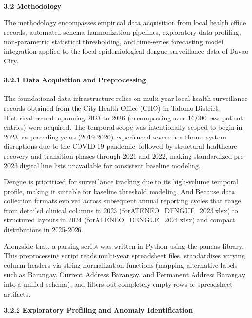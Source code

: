 \documentclass[
]{article}
\begin{document}
\textbf{3.2 Methodology}

The methodology encompasses empirical data acquisition from local health
office records, automated schema harmonization pipelines, exploratory
data profiling, non-parametric statistical thresholding, and time-series
forecasting model integration applied to the local epidemiological
dengue surveillance data of Davao City.

\paragraph{\texorpdfstring{\textbf{3.2.1 Data Acquisition and
Preprocessing}
}{3.2.1 Data Acquisition and Preprocessing }}\label{data-acquisition-and-preprocessing}

The foundational data infrastructure relies on multi-year local health
surveillance records obtained from the City Health Office (CHO) in
Talomo District. Historical records spanning 2023 to 2026 (encompassing
over 16,000 raw patient entries) were acquired. The temporal scope was
intentionally scoped to begin in 2023, as preceding years (2019-2020)
experienced severe healthcare system disruptions due to the COVID-19
pandemic, followed by structural healthcare recovery and transition
phases through 2021 and 2022, making standardized pre-2023 digital line
lists unavailable for consistent baseline modeling.

Dengue is prioritized for surveillance tracking due to its high-volume
temporal profile, making it suitable for baseline threshold modeling.
And Because data collection formats evolved across subsequent annual
reporting cycles that range from detailed clinical columns in 2023
(forATENEO\_DENGUE\_2023.xlsx) to structured layouts in 2024
(forATENEO\_DENGUE\_2024.xlsx) and compact distributions in 2025-2026.

Alongside that, a parsing script was written in Python using the pandas
library. This preprocessing script reads multi-year spreadsheet files,
standardizes varying column headers via string normalization functions
(mapping alternative labels such as Barangay, Current Address Barangay,
and Permanent Address Barangay into a unified schema), and filters out
completely empty rows or spreadsheet artifacts.

\textbf{3.2.2 Exploratory Profiling and Anomaly Identification}
\end{document}
